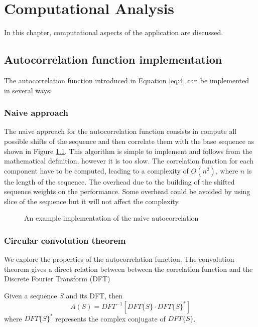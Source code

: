 \chapter{ Computational Analysis}\label{chap:computational_analysis}

In this chapter,  computational aspects of the application are discussed.


  \section{ Autocorrelation function implementation}
    The autocorrelation function introduced in Equation \eqref{eq:4} can be
    implemented in several ways:

      \subsection{Naive approach}
        The naive approach for the autocorrelation function consists in
        compute all possible shifts of the sequence and then
        correlate them with the base sequence as shown in Figure
        \ref{naive_auto:fig:1}.  This algorithm is simple to implement and
        follows from the mathematical definition, however it is too slow. The
        correlation function for each component have to be computed, leading to a
        complexity of $O(n^{2})$, where $n$ is the length of the sequence. The
        overhead due to the building of  the shifted sequence weights on the
        performance. Some overhead could be avoided by using slice of the sequence
        but it will not affect the complexity.\\

        \begin{figure}[ht!]
          \caption{An example implementation of the naive autocorrelation}
          \label{naive_auto:fig:1}
        \end{figure}

      \subsection{Circular convolution theorem}\label{section:impl:convolution}
      We explore the properties of the autocorrelation function. The convolution theorem\cite{golomb_ref} gives a  direct relation between between the correlation function and the Discrete Fourier Transform (DFT)\\
      \begin{theorem}
          Given a sequence $S$ and its DFT, then
          \begin{equation}
            A(S) = DFT^{-1}[DFT\{S\} · DFT\{S\}^{*}]
          \end{equation}
          where $DFT\{S\}^{*}$ represents the complex conjugate of $DFT\{S\}$.
        \end{theorem}

